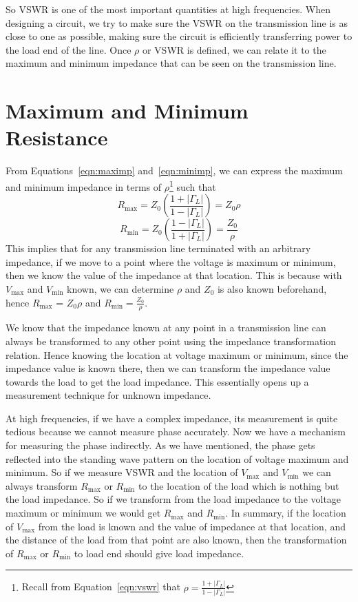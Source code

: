So VSWR is one of the most important quantities at high frequencies. When designing a circuit, we try to make sure the VSWR on the transmission line is as close to one as possible, making sure the circuit is efficiently transferring power to the load end of the line. Once $\rho$ or VSWR is defined, we can relate it to the maximum and minimum impedance that can be seen on the transmission line.

\section{Maximum and Minimum Resistance}
From Equations~\eqref{eqn:maximp} and~\eqref{eqn:minimp}, we can express the maximum and minimum impedance in terms of $\rho$\footnote{
Recall from Equation~\eqref{eqn:vswr} that $\rho = \frac{1 + |\Gamma_L|}{1 - |\Gamma_L|}$
} such that
\begin{dmath}
R_{\max} = Z_0 \left(\frac{1 + |\Gamma_L|}{1 - |\Gamma_L|}\right)
= Z_0\rho
\label{eqn:maximprho}
\end{dmath}
\begin{dmath}
R_{\min} = Z_0 \left(\frac{1 - |\Gamma_L|}{1 + |\Gamma_L|}\right) 
=\frac{Z_0}{\rho}
\label{eqn:minimprho}
\end{dmath}
This implies that for any transmission line terminated with an arbitrary impedance, if we move to a point where the voltage is maximum or minimum, then we know the value of the impedance at that location. This is because with $V_{\max}$ and $V_{\min}$ known, we can determine $\rho$ and $Z_0$ is also known beforehand, hence $R_{\max}$ = $Z_0 \rho$ and $R_{\min} = \frac{Z_0}{\rho}$.

We know that the impedance known at any point in a transmission line can always be transformed to any other point using the impedance transformation relation. Hence knowing the location at voltage maximum or minimum, since the impedance value is known there, then we can transform the impedance value towards the load to get the load impedance. This essentially opens up a measurement technique for unknown impedance.

At high frequencies, if we have a complex impedance, its measurement is quite tedious because we cannot measure phase accurately. Now we have a mechanism for measuring the phase indirectly. As we have mentioned, the phase gets reflected into the standing wave pattern on the location of voltage maximum and minimum. So if we measure VSWR and the location of $V_{\max}$ and $V_{\min}$ we can always transform $R_{\max}$ or $R_{\min}$ to the location of the load which is nothing but the load impedance. So if we transform from the load impedance to the voltage maximum or minimum we would get $R_{\max}$ and $R_{\min}$. In summary, if the location of $V_{\max}$ from the load is known and the value of impedance at that location, and the distance of the load from that point are also known, then the transformation of $R_{\max}$ or $R_{\min}$ to load end should give load impedance.

